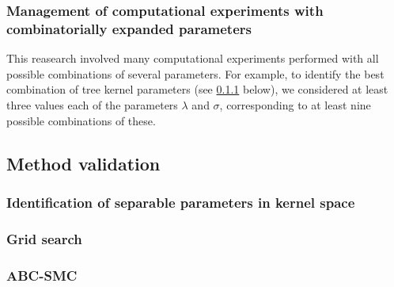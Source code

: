 \subsubsection{Management of computational experiments with combinatorially
expanded parameters}

This reasearch involved many computational experiments performed with all
possible combinations of several parameters. For example, to identify the best
combination of tree kernel parameters (see \ref{subsubsec:kernel} below), we
considered at least three values each of the parameters $\lambda$ and $\sigma$,
corresponding to at least nine possible combinations of these. 

\subsection{Method validation}

\subsubsection{Identification of separable parameters in kernel space}
\label{subsubsec:kernel}

\subsubsection{Grid search}

\subsubsection{ABC-SMC}
